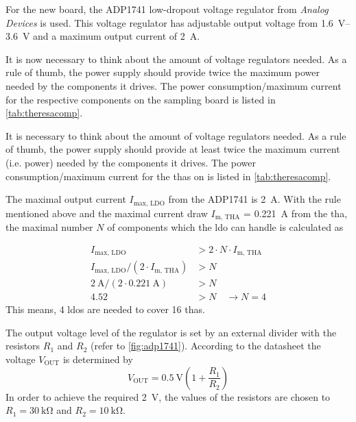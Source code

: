 For the new board, the ADP1741 low-dropout voltage regulator from \textit{Analog Devices} is used. This voltage regulator has adjustable output voltage from \SIrange{1.6}{3.6}{\volt} and a maximum output current of \SI{2}{\ampere}. 

It is now necessary to think about the amount of voltage regulators needed.
As a rule of thumb, the power supply should provide twice the maximum power needed by the components it drives. \cite{michele}
The power consumption/maximum current for the respective components on the sampling board is listed in \autoref{tab:theresacomp}. 

It is necessary to think about the amount of voltage regulators needed. As a rule of thumb, the power supply should provide at least twice the maximum current (i.e. power) needed by the components it drives. \cite{michele} The power consumption/maximum current for the \glspl{tha} on is listed in \autoref{tab:theresacomp}. 

The maximal output current $I_\text{max, LDO}$ from the ADP1741 is \SI{2}{\ampere}.
With the rule mentioned above and the maximal current draw $I_\text{m, THA}$ = \SI{0.221}{\ampere} from the \gls{tha}, the maximal number $N$ of components which the \gls{ldo} can handle is calculated as 

\begin{align*}
	I_\text{max, LDO} &> 2 \cdot N \cdot I_\text{m, THA} \\
	I_\text{max, LDO}/(2 \cdot I_\text{m, THA}) &> N \\
	\SI{2}{\ampere} / (2\cdot \SI{0.221}{\ampere}) &> N \\
	4.52 &> N \quad \rightarrow N = 4
\end{align*}
This means, 4 \glspl{ldo} are needed to cover 16 \glspl{tha}.

The output voltage level of the regulator is set by an external divider with the resistors $R_1$ and $R_2$ (refer to \autoref{fig:adp1741}). According to the datasheet \cite{adp1741} the voltage $V_\text{OUT}$ is determined by
\begin{equation}\label{eq:ldo}
	V_\text{OUT} = \SI{0.5}{\volt}\left(1 + \frac{R_1}{R_2} \right)
\end{equation}
In order to achieve the required \SI{2}{\volt}, the values of the resistors are chosen to $R_1 = \SI{30}{\kilo\ohm}$ and $R_2 = \SI{10}{\kilo \ohm}$. 


